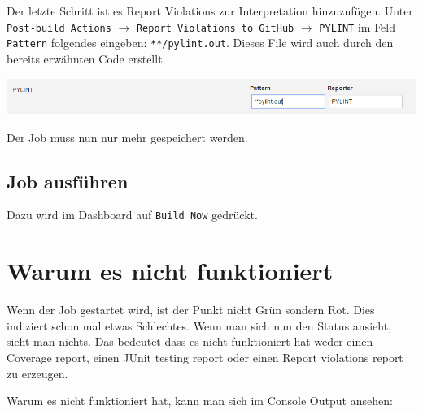 Der letzte Schritt ist es Report Violations zur Interpretation hinzuzufügen. Unter \verb|Post-build Actions| $\rightarrow$ \verb|Report Violations to GitHub| $\rightarrow$ \verb|PYLINT| im Feld \verb|Pattern| folgendes eingeben: \verb|**/pylint.out|. Dieses File wird auch durch den bereits erwähnten Code erstellt.

\begin{minipage}{\linewidth}
	\centering
	\includegraphics[width=0.8\linewidth]{images/report_violations}
\end{minipage}

Der Job muss nun nur mehr gespeichert werden.

\subsection{Job ausführen}
Dazu wird im Dashboard auf \verb|Build Now| gedrückt. 

\section{Warum es nicht funktioniert}
Wenn der Job gestartet wird, ist der Punkt nicht Grün sondern Rot. Dies indiziert schon mal etwas Schlechtes. Wenn man sich nun den Status ansieht, sieht man nichts. Das bedeutet dass es nicht funktioniert hat weder einen Coverage report, einen JUnit testing report oder einen Report violations report zu erzeugen.

Warum es nicht funktioniert hat, kann man sich im Console Output ansehen:

